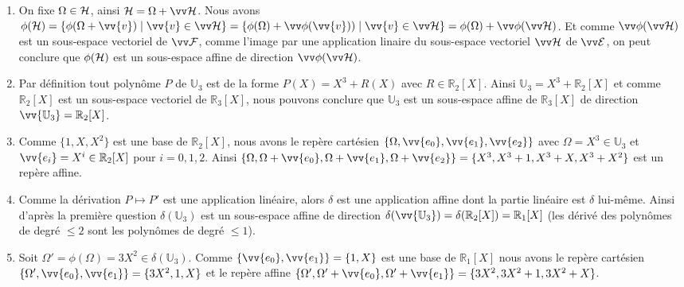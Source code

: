 \documentclass[a4paper,12pt,reqno]{amsart}
\begin{document}
\begin{solution}
  \begin{enumerate}
    \item On fixe $\Omega \in \mathcal{H}$, ainsi $\ens{H} = \Omega + \ev{H}$. Nous avons $\phi(\ens{H}) = \{ \phi(\Omega + \vv{v}) \mid \vv{v} \in \ev{H}\} = \{ \phi(\Omega) + \vv\phi(\vv{v})) \mid \vv{v} \in \ev{H}\} = \phi(\Omega) + \vv\phi(\ev{H})$. Et comme $\vv\phi(\ev{H})$ est un sous-espace vectoriel de $\ev{F}$, comme l'image par une application linaire du sous-espace vectoriel $\ev{H}$ de $\ev{E}$, on peut conclure que $\phi(\mathcal{H})$ est un sous-espace affine de direction $\vv\phi(\ev{H})$.
    \item Par définition tout polynôme $P$ de $\mathbb{U}_{3}$ est de la forme $P(X)=X^{3}+R(X)$ avec $R \in \mathbb{R}_{2}[X]$. Ainsi $\mathbb{U}_{3} = X^{3} + \mathbb{R}_{2}[X]$ et comme $\mathbb{R}_{2}[X]$ est un sous-espace vectoriel de $\mathbb{R}_{3}[X]$, nous pouvons conclure que $\mathbb{U}_{3}$ est un sous-espace affine de $\mathbb{R}_{3}[X]$ de direction $\vv{\mathbb{U}_{3}}=\mathbb{R}_{2}[X]$.
    \item Comme $\{1,X,X^2\}$ est une base de $\mathbb{R}_{2}[X]$, nous avons le repère cartésien $\{\Omega,\vv{e_{0}},\vv{e_{1}},\vv{e_{2}}\}$ avec $\Omega = X^{3} \in \mathbb{U}_{3}$ et $\vv{e_{i}}=X^{i} \in \mathbb{R}_{2}[X]$ pour $i=0,1,2$. Ainsi $\{\Omega,\Omega+\vv{e_{0}},\Omega+\vv{e_{1}},\Omega+\vv{e_{2}}\} = \{X^{3},X^{3}+1,X^{3}+X,X^{3}+X^{2}\}$ est un repère affine.
    \item Comme la dérivation $P \mapsto P'$ est une application linéaire, alors $\delta$ est une application affine dont la partie linéaire est $\delta$ lui-même. Ainsi d'après la première question $\delta(\mathbb{U}_{3})$ est un sous-espace affine de direction $\delta(\vv{\mathbb{U}_{3}})=\delta(\mathbb{R}_{2}[X]) = \mathbb{R}_{1}[X]$ (les dérivé des polynômes de degré $\leq 2$ sont les polynômes de degré $\leq 1$).
    \item Soit $\Omega'=\phi(\Omega)=3X^{2} \in \delta(\mathbb{U}_{3})$. Comme $\{\vv{e_{0}},\vv{e_{1}}\}=\{1,X\}$ est une base de $\mathbb{R}_{1}[X]$ nous avons le repère cartésien $\{\Omega',\vv{e_{0}},\vv{e_{1}}\} = \{3X^{2},1,X\}$ et le repère affine $\{\Omega',\Omega'+\vv{e_{0}},\Omega'+\vv{e_{1}}\} = \{3X^{2},3X^{2}+1,3X^{2}+X\}$.
  \end{enumerate}

\end{solution}

\tsvp
\ifsolutions\else\newpage\fi
\end{document}
